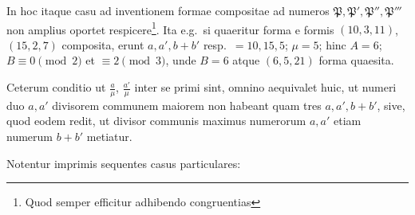 \documentclass[12pt,a4paper]{article}
\theoremstyle{plain}
\theoremstyle{definition}
\theoremstyle{remark}
\theoremstyle{problemstyle}
\begin{document}
In hoc itaque casu ad inventionem formae compositae ad numeros $\mathfrak{P}, \mathfrak{P}', \mathfrak{P}'', \mathfrak{P}'''$ non amplius oportet respicere\footnote{Quod semper efficitur adhibendo congruentias}. Ita e.g.\ si quaeritur forma e formis $(10, 3, 11)$, $(15, 2, 7)$ composita, erunt $a, a', b+b'$ resp.\ $= 10, 15, 5$; $\mu = 5$; hinc $A = 6$; $B \equiv 0 \pmod{2}$ et $\equiv 2 \pmod{3}$, unde $B = 6$ atque $(6, 5, 21)$ forma quaesita.

Ceterum conditio ut $\tfrac{a}{\mu}$, $\tfrac{a'}{\mu}$ inter se primi sint, omnino aequivalet huic, ut numeri duo $a, a'$ divisorem communem maiorem non habeant quam tres $a, a', b+b'$, sive, quod eodem redit, ut divisor communis maximus numerorum $a, a'$ etiam numerum $b + b'$ metiatur.

Notentur imprimis sequentes casus particulares:
\end{document}

